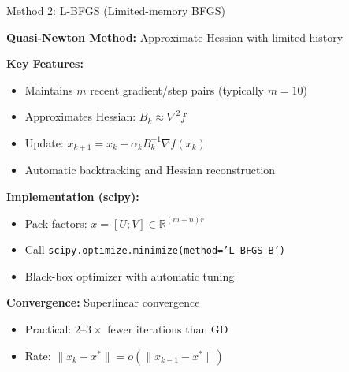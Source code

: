\documentclass[aspectratio=169,usenames,dvipsnames]{beamer}
\begin{document}
\begin{frame}{Method 2: L-BFGS (Limited-memory BFGS)}
    
    \textbf{Quasi-Newton Method:} Approximate Hessian with limited history
    
    \vspace{0.3cm}
    
    \textbf{Key Features:}
    \begin{itemize}
        \item Maintains $m$ recent gradient/step pairs (typically $m = 10$)
        \item Approximates Hessian: $B_k \approx \nabla^2 f$
        \item Update: $x_{k+1} = x_k - \alpha_k B_k^{-1} \nabla f(x_k)$
        \item Automatic backtracking and Hessian reconstruction
    \end{itemize}
    
    \vspace{0.3cm}
    
    \textbf{Implementation (scipy):}
    \begin{itemize}
        \item Pack factors: $x = [U; V] \in \mathbb{R}^{(m+n)r}$
        \item Call \texttt{scipy.optimize.minimize(method='L-BFGS-B')}
        \item Black-box optimizer with automatic tuning
    \end{itemize}
    
    \vspace{0.3cm}
    
    \textbf{Convergence:} Superlinear convergence
    \begin{itemize}
        \item Practical: $2$--$3\times$ fewer iterations than GD
        \item Rate: $\|x_k - x^*\| = o(\|x_{k-1} - x^*\|)$
    \end{itemize}
\end{frame}
\end{document}
